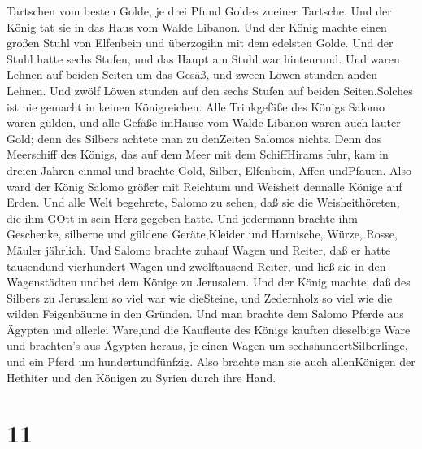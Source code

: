 Tartschen vom besten Golde, je drei Pfund Goldes zueiner Tartsche. Und
der König tat sie in das Haus vom Walde Libanon.  Und der
König machte einen großen Stuhl von Elfenbein und überzogihn mit dem
edelsten Golde.  Und der Stuhl hatte sechs Stufen, und das
Haupt am Stuhl war hintenrund. Und waren Lehnen auf beiden Seiten um das
Gesäß, und zween Löwen stunden anden Lehnen.  Und zwölf
Löwen stunden auf den sechs Stufen auf beiden Seiten.Solches ist nie
gemacht in keinen Königreichen.  Alle Trinkgefäße des
Königs Salomo waren gülden, und alle Gefäße imHause vom Walde Libanon
waren auch lauter Gold; denn des Silbers achtete man zu denZeiten
Salomos nichts.  Denn das Meerschiff des Königs, das auf
dem Meer mit dem SchiffHirams fuhr, kam in dreien Jahren einmal und
brachte Gold, Silber, Elfenbein, Affen undPfauen.  Also
ward der König Salomo größer mit Reichtum und Weisheit dennalle Könige
auf Erden.  Und alle Welt begehrete, Salomo zu sehen, daß
sie die Weisheithöreten, die ihm GOtt in sein Herz gegeben hatte.
 Und jedermann brachte ihm Geschenke, silberne und güldene
Geräte,Kleider und Harnische, Würze, Rosse, Mäuler jährlich.
 Und Salomo brachte zuhauf Wagen und Reiter, daß er hatte
tausendund vierhundert Wagen und zwölftausend Reiter, und ließ sie in
den Wagenstädten undbei dem Könige zu Jerusalem.  Und der
König machte, daß des Silbers zu Jerusalem so viel war wie dieSteine,
und Zedernholz so viel wie die wilden Feigenbäume in den Gründen.
 Und man brachte dem Salomo Pferde aus Ägypten und allerlei
Ware,und die Kaufleute des Königs kauften dieselbige Ware 
und brachten's aus Ägypten heraus, je einen Wagen um
sechshundertSilberlinge, und ein Pferd um hundertundfünfzig. Also
brachte man sie auch allenKönigen der Hethiter und den Königen zu Syrien
durch ihre Hand.

\hypertarget{section-10}{%
\section{11}\label{section-10}}

